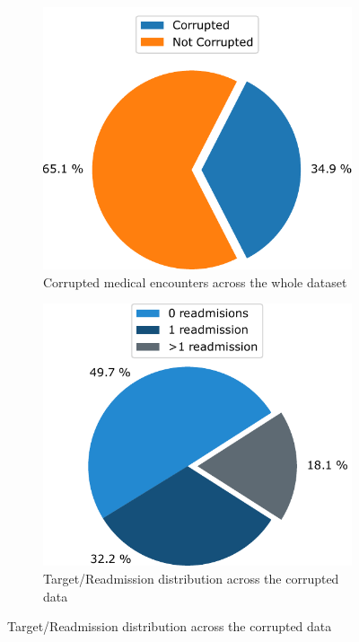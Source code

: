\documentclass[a4paper,11pt]{article}
\begin{document}
\begin{figure}[htb]
\centering
\begin{subfigure}{0.32\textwidth}
    \includegraphics[width=\textwidth]{images/pie_1.pdf}
    \caption{Corrupted medical encounters across the whole dataset}
    \label{fig:duplicated_patients_first}
\end{subfigure}
\hfill
\begin{subfigure}{0.32\textwidth}
    \includegraphics[width=\textwidth]{images/pie_2.pdf}
    \caption{Target/Readmission distribution across the corrupted data}

\end{subfigure}
\end{figure}
\end{document}
